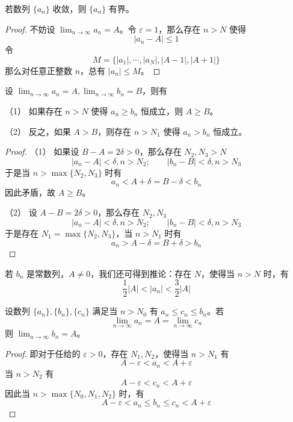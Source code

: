 \begin{theorem}[有界性]
	若数列 $\{a_n\}$ 收敛，则 $\{a_n\}$ 有界。
\end{theorem}

\begin{proof}
	不妨设 $\displaystyle\lim_{n\to \infty} a_n = A$。令 $\varepsilon = 1$，那么存在 $n>N$ 使得
	$$|a_n-A| \leqslant 1$$
	令
	$$M = \{|a_1|,\cdots,|a_N|,|A-1|,|A+1|\}$$
	那么对任意正整数 $n$，总有 $|a_n|\leqslant M$。
\end{proof}

\begin{theorem}
	设 $\displaystyle\lim_{n\to \infty} a_n = A,\displaystyle\lim_{n\to \infty} b_n = B$，则有

	（1） 如果存在 $n>N$ 使得 $a_n\geqslant b_n$ 恒成立，则 $A\geqslant B$。

	（2） 反之，如果 $A>B$，则存在 $n>N_1$ 使得 $a_n>b_n$ 恒成立。
\end{theorem}
\begin{proof}
	（1） 如果设 $B-A=2\delta>0$，那么存在 $N_2,N_3>N$
	$$|a_n-A|<\delta,n>N_2;\qquad |b_n-B|<\delta,n>N_3$$
	于是当 $n>\max\{N_2,N_3\}$ 时有
	$$a_n<A+\delta=B-\delta<b_n$$
	因此矛盾，故 $A\geqslant B$。

	（2） 设 $A-B=2\delta>0$，那么存在 $N_2,N_3$
	$$|a_n-A|<\delta,n>N_2;\qquad |b_n-B|<\delta,n>N_3$$
	于是存在 $N_1=\max\{N_2,N_3\}$，当 $n>N_1$ 时有
	$$a_n>A-\delta=B+\delta>b_n$$
\end{proof}

若 $b_n$ 是常数列，$A\ne 0$，我们还可得到推论：存在 $N$，使得当 $n>N$ 时，有
$$\frac{1}{2}|A| < |a_n| < \frac{3}{2}|A|$$

\begin{theorem}
	设数列 $\{a_n\},\{b_n\},\{c_n\}$ 满足当 $n>N_0$ 有 $a_n\leqslant c_n\leqslant b_n$。若
	$$\lim_{n\to \infty}a_n = A = \lim_{n\to \infty}c_n$$
	则 $\displaystyle\lim_{n\to \infty}b_n = A$。
\end{theorem}
\begin{proof}
	即对于任给的 $\varepsilon>0$，存在 $N_1,N_2$，使得当 $n>N_1$ 有 
	$$A-\varepsilon<a_n<A+\varepsilon$$
	当 $n>N_2$ 有 
	$$A-\varepsilon<c_n<A+\varepsilon$$
	因此当 $n>\max\{N_0,N_1,N_2\}$ 时，有
	$$A-\varepsilon < a_n \leqslant b_n \leqslant c_n < A+\varepsilon$$
\end{proof}


